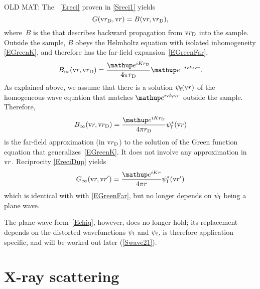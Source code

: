 OLD MAT:
The ~\cref{Ereci}
%
proven in \cref{Sreci1}
yields
\begin{equation}\label{EreciDup}
  G(\rD,\r) = B(\r,\rD),
\end{equation}
%
where~$B$ is the 
that describes backward propagation from $\rD$ into the sample.
Outside the sample,
$B$ obeys the Helmholtz equation
with isolated inhomogeneity \cref{EGreenK},
and therefore has the far-field expansion~\cref{EGreenFar},
%
\begin{equation}\label{EBFar}
  B_\infty(\r,\rD)
  =\frac{\e^{iKr_\text{D}}}{4\pi r_\text{D}}\e^{-i\k_\sf \r}.
\end{equation}
As explained above,
we assume that there is a solution $\psi_\sf(\r)$ of the homogeneous
wave equation that matches $\e^{i\k_\sf \r}$ outside the sample.
Therefore,
\begin{equation}\label{EBFull}
  B_\infty(\r,\rD)
  = \frac{\e^{iKr_\text{D}}}{4\pi r_\text{D}}\psi^*_\sf(\r)
\end{equation}
is the far-field approximation (in $\rD$)
to the solution of the Green function equation that generalizes~\cref{EGreenK}.
It does not involve any approximation in~$\r$.
Reciprocity \cref{EreciDup} yields
\begin{equation}\label{EGreenFarDWBA}
  G_\infty(\r,\r')
  = \frac{\e^{iKr}}{4\pi r}\psi^*_\sf(\r')
\end{equation}
which is identical with with \cref{EGreenFar},
but no longer depends on $\psi_\sf$ being a plane wave.

The plane-wave form~\cref{Echiq}, however, does no longer hold;
its replacement depends on the distorted wavefunctions
$\psi_\si$ and $\psi_\sf$,
is therefore application specific,
and will be worked out later (\cref{Swave21}).
%
%
%

%

\section{X-ray scattering}\label{SXray}
%

